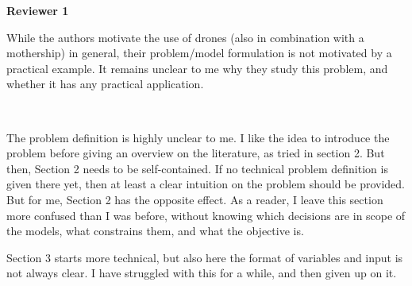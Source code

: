 \documentclass{article}
\newenvironment{reviewer}{\setcounter{pointcounter}{1}}{}
\newcommand{\point}{\text{{\selectfont \thepointcounter} \stepcounter{pointcounter}}}
\begin{document}

\begin{reviewer}
\begin{tcolorbox}[breakable,enhanced,coltitle=black,colback=red!75!black,colframe=red!75!black,borderline={1pt}{0pt}{black},boxrule=0pt]
\textbf{Reviewer 1}
\end{tcolorbox}

\begin{itshape}
While the authors motivate the use of drones (also in combination with a mothership) in general, their problem/model formulation is not motivated by a practical example. It remains unclear to me why they study this problem, and whether it has any practical application.
\end{itshape}
\\
\begin{tcolorbox}[breakable,enhanced,coltitle=black,colback=red!5!white,colframe=red!75!black,title=\textbf{Answer R1.\point},borderline={1pt}{0pt}{black},boxrule=0pt]

\end{tcolorbox}

\begin{itshape}
The problem definition is highly unclear to me. I like the idea to introduce the problem before giving an overview on the literature, as tried in section 2. But then, Section 2 needs to be self-contained. If no technical problem definition is given there yet, then at least a clear intuition on the problem should be provided. But for me, Section 2 has the opposite effect. As a reader, I leave this section more confused than I was before, without knowing which decisions are in scope of the models, what constrains them, and what the objective is.
\end{itshape}

\begin{tcolorbox}[breakable,enhanced,coltitle=black,colback=red!5!white,colframe=red!75!black,title=\textbf{Answer R1.\point},borderline={1pt}{0pt}{black},boxrule=0pt]

\end{tcolorbox}

\begin{itshape}
Section 3 starts more technical, but also here the format of variables and input is not always clear. I have struggled with this for a while, and then given up on it.
\end{itshape}


\end{reviewer}
\end{document}
